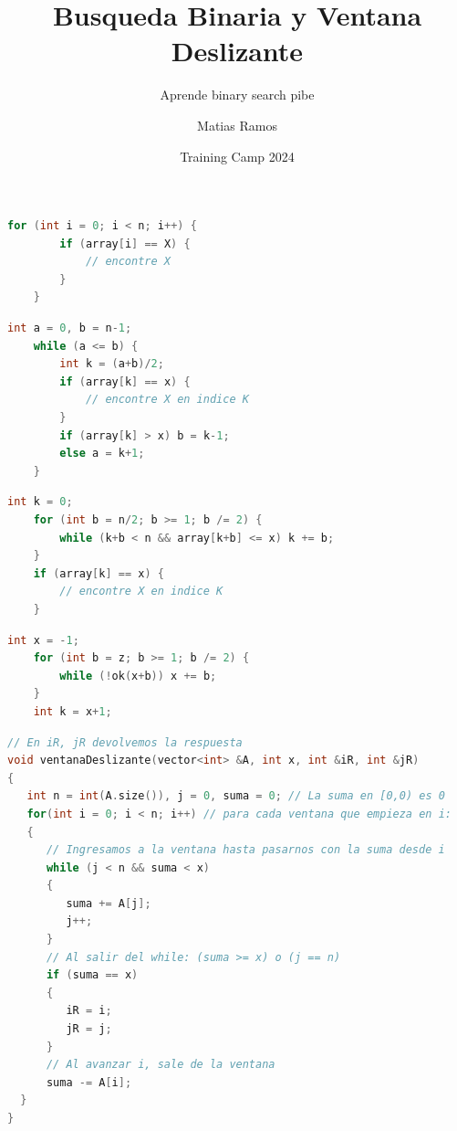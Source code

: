 \documentclass{beamer}
\title %
{Busqueda Binaria y Ventana Deslizante}
\subtitle{Aprende binary search pibe}
\author[Matias Ramos]{Matias Ramos}
\institute[]{Universidad Tecnológica Nacional - Facultad Regional Santa Fe}
\date[TC 2024]{Training Camp 2024}
\begin{document}
\busquedaLineal
{
	\begin{lstlisting}[language=C++,basicstyle=\ttfamily,keywordstyle=\color{NavyBlue},commentstyle=\color{Mahogany}\ttfamily]
    for (int i = 0; i < n; i++) {
        if (array[i] == X) {
            // encontre X
        }
    }
	\end{lstlisting}
}

\busquedaBinariaNormal
{
	\begin{lstlisting}[language=C++,basicstyle=\ttfamily,keywordstyle=\color{NavyBlue},commentstyle=\color{Mahogany}\ttfamily]
    int a = 0, b = n-1;
    while (a <= b) {
        int k = (a+b)/2;
        if (array[k] == x) {
            // encontre X en indice K
        }
        if (array[k] > x) b = k-1;
        else a = k+1;
    }
    \end{lstlisting}
}

\busquedaBinariaTricky
{
	\begin{lstlisting}[language=C++,basicstyle=\ttfamily,keywordstyle=\color{NavyBlue},commentstyle=\color{Mahogany}\ttfamily]
    int k = 0;
    for (int b = n/2; b >= 1; b /= 2) {
        while (k+b < n && array[k+b] <= x) k += b;
    }
    if (array[k] == x) {
        // encontre X en indice K
    }
    \end{lstlisting}
}

\busquedaBinariaDisp
{
	\begin{lstlisting}[language=C++,basicstyle=\ttfamily,keywordstyle=\color{NavyBlue},commentstyle=\color{Mahogany}\ttfamily]
    int x = -1;
    for (int b = z; b >= 1; b /= 2) {
        while (!ok(x+b)) x += b;
    }
    int k = x+1;
    \end{lstlisting}
}

\ventanaDeslizante
{
{\fontsize{7.5pt}{8.5pt}
	\begin{lstlisting}[language=C++,basicstyle=\ttfamily,keywordstyle=\color{NavyBlue}, commentstyle=\color{Mahogany}\ttfamily,]
// En iR, jR devolvemos la respuesta
void ventanaDeslizante(vector<int> &A, int x, int &iR, int &jR) 
{ 
   int n = int(A.size()), j = 0, suma = 0; // La suma en [0,0) es 0
   for(int i = 0; i < n; i++) // para cada ventana que empieza en i:
   {
      // Ingresamos a la ventana hasta pasarnos con la suma desde i
      while (j < n && suma < x) 
      {
         suma += A[j];
         j++;
      }
      // Al salir del while: (suma >= x) o (j == n)
      if (suma == x)
      {
         iR = i;
         jR = j;
      }
      // Al avanzar i, sale de la ventana      
      suma -= A[i];
  }
}
	\end{lstlisting}
}
}
\end{document}
